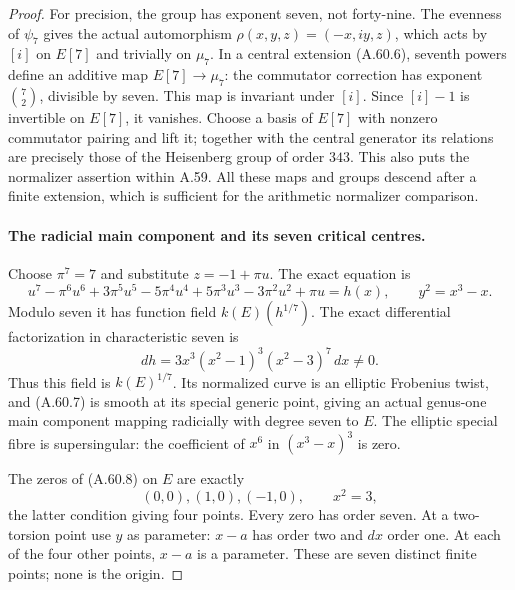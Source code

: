 \begin{proof}
For precision, the group has exponent seven, not
forty-nine. The evenness of \(\psi _7\) gives the actual
automorphism \(\rho(x,y,z)=(-x,iy,z)\), which acts by
\([i]\) on \(E[7]\) and trivially on \(\mu _7\).
In a central extension (A.60.6), seventh powers define
an additive map \(E[7]\to\mu _7\): the commutator
correction has exponent \(\binom72\), divisible by
seven. This map is invariant under \([i]\). Since
\([i]-1\) is invertible on \(E[7]\), it vanishes.
Choose a basis of \(E[7]\) with nonzero commutator
pairing and lift it; together with the central generator
its relations are precisely those of the Heisenberg
group of order \(343\). This also puts the normalizer
assertion within A.59. All these maps and groups descend
after a finite extension, which is sufficient for the
arithmetic normalizer comparison.

\paragraph{The radicial main component and its seven critical centres.}
Choose \(\pi^7=7\) and substitute \(z=-1+\pi u\).
The exact equation is
\[
 u^7-\pi^6u^6+3\pi^5u^5-5\pi^4u^4
             +5\pi^3u^3-3\pi^2u^2+\pi u=h(x),
                \qquad y^2=x^3-x.                     \tag{A.60.7}
\]
Modulo seven it has function field \(k(E)(h^{1/7})\).
The exact differential factorization in characteristic seven is
\[
                   dh=3x^3(x^2-1)^3(x^2-3)^7\,dx\ne0.
                                                        \tag{A.60.8}
\]
Thus this field is \(k(E)^{1/7}\). Its normalized curve
is an elliptic Frobenius twist, and (A.60.7) is smooth
at its special generic point, giving an actual
genus-one main component mapping radicially with degree
seven to \(E\). The elliptic special fibre is
supersingular: the coefficient of \(x^6\) in
\((x^3-x)^3\) is zero.

The zeros of (A.60.8) on \(E\) are exactly
\[
                (0,0),(1,0),(-1,0),
                            \qquad x^2=3,              \tag{A.60.9}
\]
the latter condition giving four points. Every zero
has order seven. At a two-torsion point use \(y\)
as parameter: \(x-a\) has order two and \(dx\)
order one. At each of the four other points, \(x-a\)
is a parameter. These are seven distinct finite points;
none is the origin.


\end{proof}
